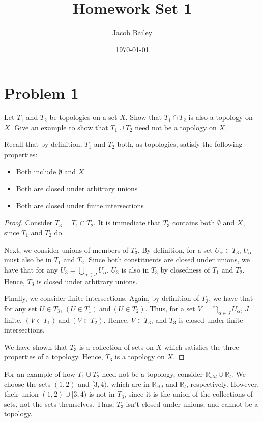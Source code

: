 \documentclass[11pt]{article}
\author{Jacob Bailey}
\date{\today}
\title{Homework Set 1}
\begin{document}
\maketitle

\section{Problem 1}
\label{sec:org49256bd}

Let \(T_1\) and \(T_2\) be topologies on a set \(X\). Show that \(T_1 \cap
T_2\) is also a topology on \(X\). Give an example to show that \(T_1\cup
T_2\) need not be a topology on \(X\). 

Recall that by definition, \(T_1\) and \(T_2\) both, as topologies,
satisfy the following properties: 

\begin{itemize}
\item Both include \(\emptyset\) and \(X\)
\item Both are closed under arbitrary unions
\item Both are closed under finite intersections
\end{itemize}

\begin{proof}
Consider \(T_3 = T_1 \cap T_2\). It is immediate that \(T_3\) contains
both \(\emptyset\) and \(X\), since \(T_1\) and \(T_2\) do. 

Next, we consider unions of members of \(T_3\). By definition, for a set
\(U_{\alpha} \in T_3\), \(U_{\alpha}\) must also be in \(T_1\) and
\(T_2\). Since both constituents are closed under unions, we have that
for any \(U_{3} = \bigcup\limits_{\alpha \in J} U_{\alpha}\), \(U_3\) is
also in \(T_3\) by closedness of \(T_1\) and \(T_2\). Hence, \(T_3\) is closed
under arbitrary unions.

Finally, we consider finite intersections. Again, by definition of
\(T_3\), we have that for any set \(U \in T_3\), \((U \in T_1)\ \text{and}\
(U \in T_2)\). Thus, for a set \(V = \bigcap\limits_{\alpha \in
J}U_{\alpha}\), \(J\) finite, \((V \in T_1)\ \text{and}\ (V \in
T_2)\). Hence, \(V \in T_3\), and \(T_3\) is closed under finite
intersections.

We have shown that \(T_3\) is a collection of sets on \(X\) which
satisfies the three properties of a topology. Hence, \(T_3\) is a
topology on \(X\). 
\end{proof}

For an example of how \(T_1\cup T_2\) need not be a topology, consider
\(\mathbb{R}_{std} \cup \mathbb{R}_l\). We choose the sets \((1,2)\) and
\([3,4)\), which are in \(\mathbb{R}_{std}\) and \(\mathbb{R}_l\),
respectively. However, their union \((1,2)\cup [3,4)\) is not in \(T_3\),
since it is the union of the collections of sets, not the sets
themselves. Thus, \(T_3\) isn't closed under unions, and cannot be a
topology.
\end{document}
